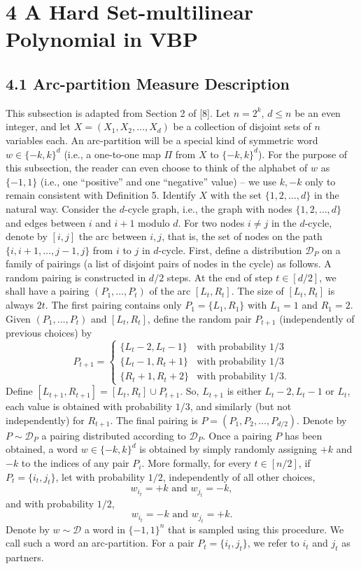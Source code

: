 \section*{4 A Hard Set-multilinear Polynomial in VBP}
\subsection*{4.1 Arc-partition Measure Description}
This subsection is adapted from Section 2 of [8]. Let $n=2^k$, $d\leq n$ be an even integer, and let $X=(X_1,X_2,\ldots,X_d)$ be a collection of disjoint sets of $n$ variables each. An arc-partition will be a special kind of symmetric word $w\in\{-k,k\}^d$ (i.e., a one-to-one map $\Pi$ from $X$ to $\{-k,k\}^d$). For the purpose of this subsection, the reader can even choose to think of the alphabet of $w$ as $\{-1,1\}$ (i.e., one ``positive'' and one ``negative'' value) -- we use $k,-k$ only to remain consistent with Definition 5.
Identify $X$ with the set $\{1,2,\ldots,d\}$ in the natural way. Consider the $d$-cycle graph, i.e., the graph with nodes $\{1,2,\ldots,d\}$ and edges between $i$ and $i+1$ modulo $d$. For two nodes $i\neq j$ in the $d$-cycle, denote by $[i,j]$ the arc between $i,j$, that is, the set of nodes on the path $\{i,i+1,\ldots,j-1,j\}$ from $i$ to $j$ in $d$-cycle. First, define a distribution $\mathcal D_P$ on a family of pairings (a list of disjoint pairs of nodes in the cycle) as follows. A random pairing is constructed in $d/2$ steps. At the end of step $t\in[d/2]$, we shall have a pairing $(P_1,\ldots,P_t)$ of the arc $[L_t,R_t]$. The size of $[L_t,R_t]$ is always $2t$. The first pairing contains only $P_1=\{L_1,R_1\}$ with $L_1=1$ and $R_1=2$. Given $(P_1,\ldots,P_t)$ and $[L_t,R_t]$, define the random pair $P_{t+1}$ (independently of previous choices) by
\[P_{t+1}=\begin{cases}\{L_t-2,L_t-1\}&\text{with probability }1/3\\\{L_t-1,R_t+1\}&\text{with probability }1/3\\\{R_t+1,R_t+2\}&\text{with probability }1/3.\end{cases}\]
Define $[L_{t+1},R_{t+1}]=[L_t,R_t]\cup P_{t+1}$. So, $L_{t+1}$ is either $L_t-2,L_t-1$ or $L_t$, each value is obtained with probability $1/3$, and similarly (but not independently) for $R_{t+1}$.
The final pairing is $P=(P_1,P_2,\ldots,P_{d/2})$. Denote by $P\sim\mathcal D_P$ a pairing distributed according to $\mathcal D_P$.
Once a pairing $P$ has been obtained, a word $w\in\{-k,k\}^d$ is obtained by simply randomly assigning $+k$ and $-k$ to the indices of any pair $P_i$. More formally, for every $t\in[n/2]$, if $P_t=\{i_t,j_t\}$, let with probability $1/2$, independently of all other choices,
\[w_{i_t}=+k\text{ and }w_{j_t}=-k,\]
and with probability $1/2$,
\[w_{i_t}=-k\text{ and }w_{j_t}=+k.\]
Denote by $w\sim\mathcal D$ a word in $\{-1,1\}^n$ that is sampled using this procedure. We call such a word an arc-partition. For a pair $P_t=\{i_t,j_t\}$, we refer to $i_t$ and $j_t$ as partners.
